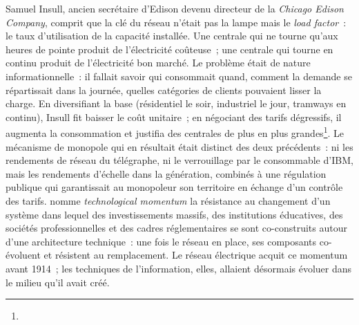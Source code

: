 %
Samuel Insull, ancien secrétaire d'Edison devenu directeur de la \emph{Chicago Edison Company}, comprit que la clé du réseau n'était pas la lampe mais le \emph{load factor}~: le taux d'utilisation de la capacité installée. Une centrale qui ne tourne qu'aux heures de pointe produit de l'électricité coûteuse~; une centrale qui tourne en continu produit de l'électricité bon marché. Le problème était de nature informationnelle~: il fallait savoir qui consommait quand, comment la demande se répartissait dans la journée, quelles catégories de clients pouvaient lisser la charge. En diversifiant la base (résidentiel le soir, industriel le jour, tramways en continu), Insull fit baisser le coût unitaire~; en négociant des tarifs dégressifs, il augmenta la consommation et justifia des centrales de plus en plus grandes\footnote{}. Le mécanisme de monopole qui en résultait était distinct des deux précédents~: ni les rendements de réseau du télégraphe, ni le verrouillage par le consommable d'IBM, mais les rendements d'échelle dans la génération, combinés à une régulation publique qui garantissait au monopoleur son territoire en échange d'un contrôle des tarifs. \textcite{hughes_networks_1983} nomme \emph{technological momentum} la résistance au changement d'un système dans lequel des investissements massifs, des institutions éducatives, des sociétés professionnelles et des cadres réglementaires se sont co-construits autour d'une architecture technique~: une fois le réseau en place, ses composants co-évoluent et résistent au remplacement. Le réseau électrique acquit ce momentum avant 1914~; les techniques de l'information, elles, allaient désormais évoluer dans le milieu qu'il avait créé.

